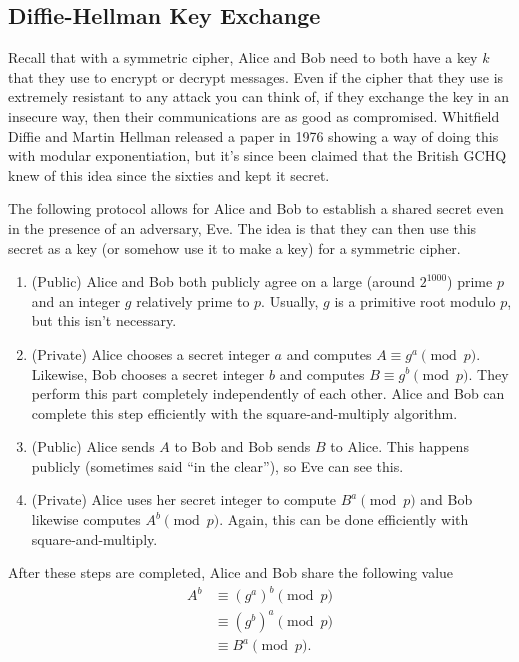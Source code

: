 \documentclass[12pt]{article}
\theoremstyle{plain}
\theoremstyle{definition}
\theoremstyle{remark}
\begin{document}
\subsection{Diffie-Hellman Key Exchange}
Recall that with a symmetric cipher, Alice and Bob need to both have a key $k$ that they use to encrypt or decrypt messages.
Even if the cipher that they use is extremely resistant to any attack you can think of, if they exchange the key in an insecure way, then their communications are as good as compromised.
Whitfield Diffie and Martin Hellman released a paper in 1976 showing a way of doing this with modular exponentiation, but it's since been claimed that the British GCHQ knew of this idea since the sixties and kept it secret.

The following protocol allows for Alice and Bob to establish a shared secret even in the presence of an adversary, Eve.
The idea is that they can then use this secret as a key (or somehow use it to make a key) for a symmetric cipher.

\begin{enumerate}
    \item (Public) Alice and Bob both publicly agree on a large (around $2^{1000}$) prime $p$ and an integer $g$ relatively prime to $p$.
    Usually, $g$ is a primitive root modulo $p$, but this isn't necessary.

    \item (Private) Alice chooses a secret integer $a$ and computes $A \equiv g^a\pmod p$.
    Likewise, Bob chooses a secret integer $b$ and computes $B \equiv g^b\pmod p$.
    They perform this part completely independently of each other.
    Alice and Bob can complete this step efficiently with the square-and-multiply algorithm.

    \item (Public) Alice sends $A$ to Bob and Bob sends $B$ to Alice.
    This happens publicly (sometimes said ``in the clear''), so Eve can see this.

    \item (Private) Alice uses her secret integer to compute $B^a \pmod p$ and Bob likewise computes $A^b\pmod p$.
    Again, this can be done efficiently with square-and-multiply.
\end{enumerate}

After these steps are completed, Alice and Bob share the following value
\begin{align*}
    A^b &\equiv (g^a)^b \pmod p\\
    &\equiv (g^b)^a\pmod p\\
    &\equiv B^a\pmod p.
\end{align*}
\end{document}
